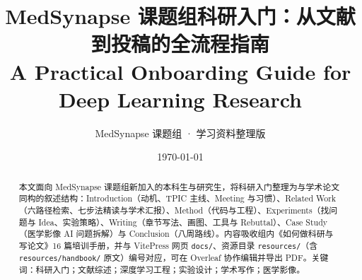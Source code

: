 \documentclass[UTF8,a4paper,11pt,fontset=fandol]{ctexart}
\title{\textbf{MedSynapse 课题组科研入门：从文献到投稿的全流程指南}\\[0.4em]
\large A Practical Onboarding Guide for Deep Learning Research}
\author{MedSynapse 课题组 · 学习资料整理版}
\date{\today}
\begin{document}
\maketitle

\begin{abstract}
\noindent
本文面向 MedSynapse 课题组新加入的本科生与研究生，将科研入门整理为与学术论文同构的叙述结构：Introduction（动机、TPIC 主线、Meeting 与习惯）、Related Work（六路径检索、七步法精读与学术汇报）、Method（代码与工程）、Experiments（找问题与 Idea、实验策略）、Writing（章节写法、画图、工具与 Rebuttal）、Case Study（医学影像 AI 问题拆解）与 Conclusion（八周路线）。内容吸收组内《如何做科研与写论文》16 篇培训手册，并与 VitePress 网页 \texttt{docs/}、资源目录 \texttt{resources/}（含 \texttt{resources/handbook/} 原文）编号对应，可在 Overleaf 协作编辑并导出 PDF。关键词：科研入门；文献综述；深度学习工程；实验设计；学术写作；医学影像。
\end{abstract}

\tableofcontents
\newpage








\appendix

\end{document}
